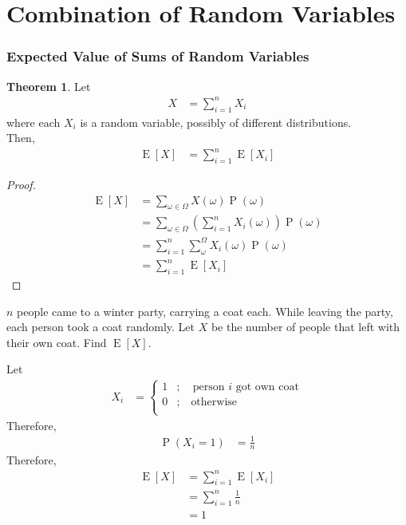 \documentclass[titlepage, fleqn, a4paper, 12pt, twoside]{article}
\theoremstyle{definition}
\theoremstyle{theorem}
\newtheorem{theorem}{Theorem}
\DeclareMathOperator{\prob}{\mathrm{P}}
\DeclareMathOperator{\expct}{\mathrm{E}}
\begin{document}
\clearpage
\part{Combination of Random Variables}

\section{Expected Value of Sums of Random Variables}

\begin{theorem}
	Let
	\begin{align*}
		X & = \sum\limits_{i = 1}^{n} X_i
	\end{align*}
	where each $X_i$ is a random variable, possibly of different distributions.\\
	Then,
	\begin{align*}
		\expct[X] & = \sum\limits_{i = 1}^{n} \expct[X_i]
	\end{align*}
\end{theorem}

\begin{proof}
	\begin{align*}
		\expct[X] & = \sum\limits_{\omega \in \Omega} X(\omega) \prob(\omega)                                          \\
                          & = \sum\limits_{\omega \in \Omega} \left( \sum\limits_{i = 1}^{n} X_i(\omega) \right) \prob(\omega) \\
                          & = \sum\limits_{i = 1}^{n} \sum\limits_{\omega}^{\Omega} X_i(\omega) \prob(\omega)                  \\
                          & = \sum\limits_{i = 1}^{n} \expct[X_i]
	\end{align*}
\end{proof}

\begin{question}
	$n$ people came to a winter party, carrying a coat each.
	While leaving the party, each person took a coat randomly.
	Let $X$ be the number of people that left with their own coat.
	Find $\expct[X]$.
\end{question}

\begin{solution}
	Let
	\begin{align*}
		X_i &=
			\begin{cases}
				1 & ;\quad \text{person $i$ got own coat} \\
				0 & ;\quad \text{otherwise}               \\
			\end{cases}
	\end{align*}
	Therefore,
	\begin{align*}
		\prob(X_i = 1) & = \frac{1}{n}
	\end{align*}
	Therefore,
	\begin{align*}
		\expct[X] & = \sum\limits_{i = 1}^{n} \expct[X_i] \\
                          & = \sum\limits_{i = 1}^{n} \frac{1}{n} \\
                          & = 1
	\end{align*}
\end{solution}
\end{document}
